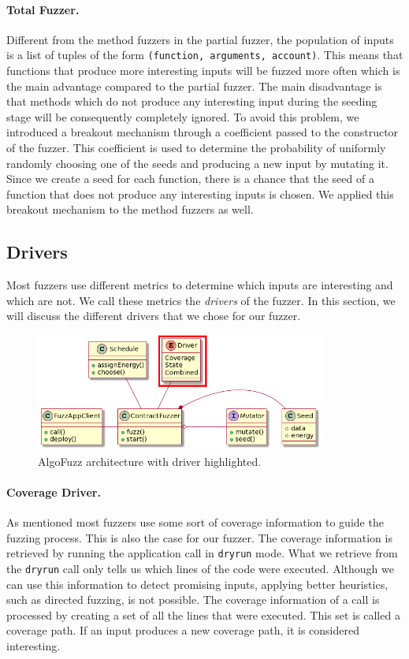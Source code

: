 \paragraph{Total Fuzzer.} Different from the method fuzzers in the partial fuzzer, the population of inputs is a list of tuples of the form \texttt{(function, arguments, account)}.
This means that functions that produce more interesting inputs will be fuzzed more often which is the main advantage compared to the partial fuzzer.
The main disadvantage is that methods which do not produce any interesting input during the seeding stage will be consequently completely ignored.
To avoid this problem, we introduced a breakout mechanism through a coefficient passed to the constructor of the fuzzer.
This coefficient is used to determine the probability of uniformly randomly choosing one of the seeds and producing a new input by mutating it.
Since we create a seed for each function, there is a chance that the seed of a function that does not produce any interesting inputs is chosen.
We applied this breakout mechanism to the method fuzzers as well.



\subsection*{Drivers}\label{section:drivers}
Most fuzzers use different metrics to determine which inputs are interesting and which are not.
We call these metrics the \textit{drivers} of the fuzzer.
In this section, we will discuss the different drivers that we chose for our fuzzer.


\begin{figure}[htbp]
    \centering
    \includegraphics[width=0.85\textwidth]{figures/arc-driver.png}
    \caption{AlgoFuzz architecture with driver highlighted.}\label{fig:architecture-driver}
\end{figure}

\paragraph{Coverage Driver.}
As mentioned most fuzzers use some sort of coverage information to guide the fuzzing process.
This is also the case for our fuzzer.
The coverage information is retrieved by running the application call in \texttt{dryrun} mode.
What we retrieve from the \texttt{dryrun} call only tells us which lines of the code were executed.
Although we can use this information to detect promising inputs, applying better heuristics, such as directed fuzzing, is not possible.
The coverage information of a call is processed by creating a set of all the lines that were executed.
This set is called a coverage path.
If an input produces a new coverage path, it is considered interesting.

